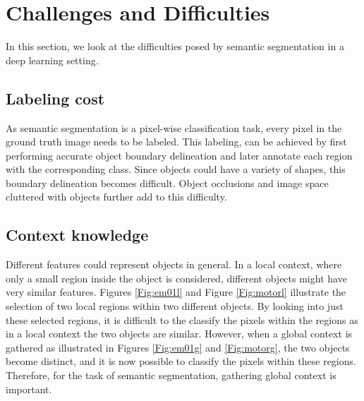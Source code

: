 \section{Challenges and Difficulties}

In this section, we look at the difficulties posed by semantic segmentation in a deep learning setting.

\subsection{Labeling cost}

As semantic segmentation is a pixel-wise classification task, every pixel in the ground truth image needs to be labeled. This labeling, can be achieved by first performing accurate object boundary delineation and later annotate each region with the corresponding class. Since objects could have a variety of shapes, this boundary delineation becomes difficult. Object occlusions and image space cluttered with objects further add to this difficulty.

\subsection{Context knowledge}

Different features could represent objects in general. In a local context, where only a small region inside the object is considered, different objects might have very similar features. Figures \ref{Fig:em01l} and Figure \ref{Fig:motorl} illustrate the selection of two local regions within two different objects. By looking into just these selected regions, it is difficult to the classify the pixels within the regions as in a local context the two objects are similar. However, when a global context is gathered as illustrated in Figures \ref{Fig:em01g} and \ref{Fig:motorg}, the two objects become distinct, and it is now possible to classify the pixels within these regions. Therefore, for the task of semantic segmentation, gathering global context is important. 

